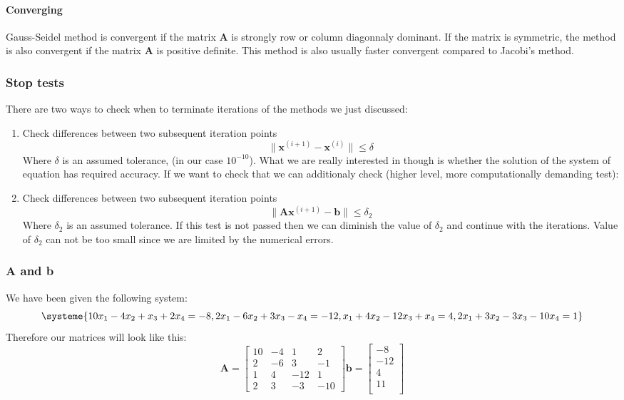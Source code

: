 \paragraph{Converging}
Gauss-Seidel method is convergent if the matrix \textbf{A} is strongly row or column diagonnaly dominant. If the matrix is symmetric, the method is also convergent if the matrix \textbf{A} is positive definite. This method is also usually faster convergent compared to Jacobi's method.

\newpage
\subsubsection{Stop tests}
There are two ways to check when to terminate iterations of the methods we just discussed:
\begin{enumerate}
\item Check differences between two subsequent iteration points
\[
\| \mathbf{x}^{(i+1)} - \mathbf{x}^{(i)} \| \leq \delta
\]
Where $\delta$ is an assumed tolerance, (in our case $10^{-10}$). What we are really interested in though is whether the solution of the system of equation has required accuracy. If we want to check that we can additionaly check (higher level, more computationally demanding test):
\item Check differences between two subsequent iteration points
\[
\| \mathbf{A}\mathbf{x}^{(i+1)} - \mathbf{b}\| \leq \delta_2
\]
Where $\delta_2$ is an assumed tolerance. If this test is not passed then we can diminish the value of $\delta_2$ and continue with the iterations. Value of $\delta_2$ can not be too small since we are limited by the numerical errors.
\end{enumerate}

\newpage
\subsubsection{\textbf{A} and \textbf{b}}
We have been given the following system:
\[
\systeme{10x_1-4x_2+x_3+2x_4=-8, 2x_1-6x_2+3x_3-x_4=-12, x_1+4x_2-12x_3+x_4=4, 2x_1+3x_2-3x_3-10x_4=1}
\]
Therefore our matrices will look like this:
\[
\textbf{A} = \begin{bmatrix}
10 & -4 & 1 & 2 \\
2 & -6 & 3 & -1 \\
1 & 4 & -12 & 1 \\
2 & 3 & -3 & -10
\end{bmatrix}
\textbf{b} = \begin{bmatrix}
-8 \\
-12 \\
4 \\
11 \\
\end{bmatrix}
\]

